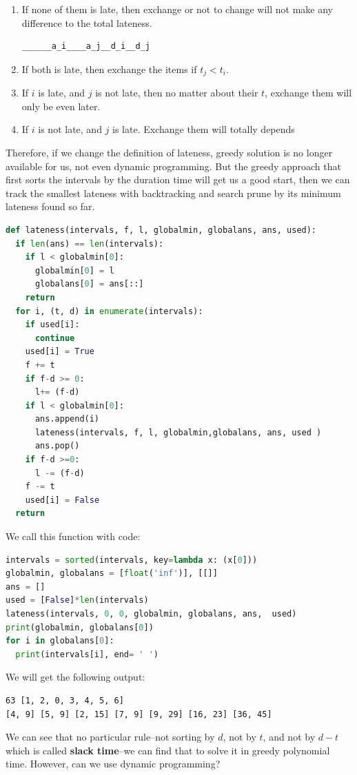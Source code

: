 \documentclass[../main.tex]{subfiles}
\begin{document}
\begin{enumerate}
    \item If none of them is late, then exchange or not to change will not make any difference to the total lateness. 
\begin{lstlisting}
______a_i____a_j__d_i__d_j
\end{lstlisting}
\item If both is late, then exchange the items if $t_j <  t_i$.
\item If $i$ is late, and $j$ is not late, then no matter about their $t$, exchange them will only be even later. 
\item If $i$ is not late, and $j$ is late. Exchange them will totally depends
\end{enumerate}
Therefore, if we change the definition of lateness, greedy solution is no longer available for us, not even dynamic programming. But the greedy approach that first sorts the intervals by the duration time will get us a good start, then we can track the smallest lateness with backtracking and search prune by its minimum lateness found so far. 
\begin{lstlisting}[language=Python]
def lateness(intervals, f, l, globalmin, globalans, ans, used):
  if len(ans) == len(intervals):
    if l < globalmin[0]:
      globalmin[0] = l
      globalans[0] = ans[::]
    return 
  for i, (t, d) in enumerate(intervals):
    if used[i]:
      continue
    used[i] = True
    f += t
    if f-d >= 0:
      l+= (f-d)
    if l < globalmin[0]:
      ans.append(i)
      lateness(intervals, f, l, globalmin,globalans, ans, used )
      ans.pop()
    if f-d >=0:
      l -= (f-d)
    f -= t
    used[i] = False
  return 
\end{lstlisting}
We call this function with code:
\begin{lstlisting}[language=Python]
intervals = sorted(intervals, key=lambda x: (x[0]))
globalmin, globalans = [float('inf')], [[]]
ans = []
used = [False]*len(intervals)
lateness(intervals, 0, 0, globalmin, globalans, ans,  used)
print(globalmin, globalans[0])
for i in globalans[0]:
  print(intervals[i], end= ' ')
\end{lstlisting}
We will get the following output:
\begin{lstlisting}[numbers=none]
63 [1, 2, 0, 3, 4, 5, 6]
[4, 9] [5, 9] [2, 15] [7, 9] [9, 29] [16, 23] [36, 45] 
\end{lstlisting}
We can see that no particular rule--not sorting by $d$, not by $t$, and not by $d-t$ which is called \textbf{slack time}--we can find that to solve it in greedy polynomial time. However, can we use dynamic programming? 
\end{document}
